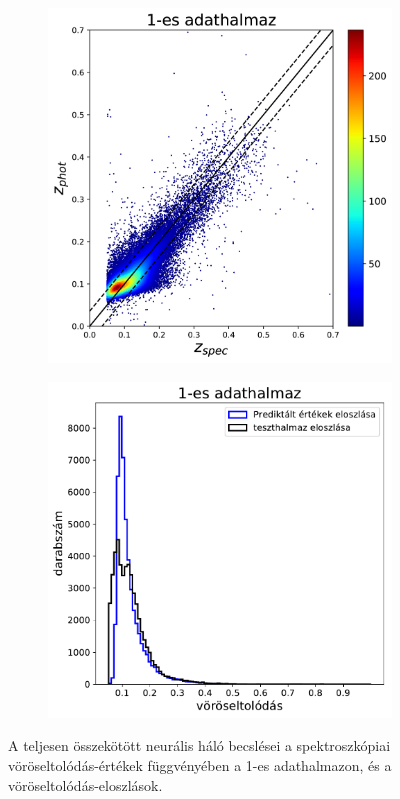 \documentclass[12pt,letterpaper,twoside,openright]{book}
\begin{document}
\begin{figure}[h!]
  \centering
  \begin{subfigure}[b]{0.3\textwidth}
    \includegraphics[width=\textwidth, height = \textwidth]{Figures/plotDNN1.png}
    \label{fig:1}
  \end{subfigure}
  \hspace{1.7cm}
  \begin{subfigure}[b]{0.3\textwidth}
    \includegraphics[width=\textwidth, height = \textwidth]{Figures/histDNN1.pdf}
    \label{fig:2}
  \end{subfigure}
  \caption{A teljesen összekötött neurális háló becslései a spektroszkópiai vöröseltolódás-értékek függvényében a 1-es adathalmazon, és a vöröseltolódás-eloszlások.}
\label{dnn1}
\end{figure}
\end{document}
